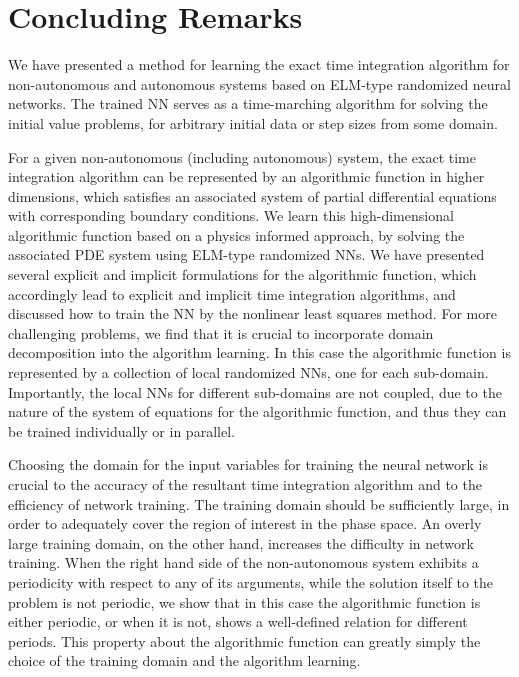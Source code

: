 \section{Concluding Remarks}
\label{sec_summary}



We have presented a method for learning the exact time integration
algorithm for non-autonomous and autonomous systems  based on ELM-type randomized
neural networks.
The trained NN  serves as a time-marching algorithm for solving
the initial value problems, for arbitrary initial data or step sizes
from some domain. 


For a given non-autonomous (including autonomous) system,
the exact time integration algorithm can be represented
by an algorithmic function in higher dimensions,
which satisfies an associated system of
partial differential equations  with corresponding boundary conditions.
We learn this high-dimensional algorithmic function based on a physics informed approach,
by solving the associated PDE system using ELM-type randomized NNs.
We have presented several explicit and implicit formulations for
the algorithmic function, which accordingly lead to explicit and implicit
time integration algorithms, and discussed how to train the NN  by
the nonlinear least squares method.
For more challenging problems,  we find that it is
crucial to incorporate 
domain decomposition into the algorithm learning. 
In this case the algorithmic function is represented by a collection
of local randomized NNs, one for each sub-domain.
Importantly, the local NNs  for different sub-domains
are not coupled, due to the nature of the system of equations
for the algorithmic function, and thus they can be trained individually or in parallel.

Choosing the domain for the input variables  for
training the neural network is crucial to the accuracy of
the resultant time integration algorithm and to the efficiency of
network training. The training domain should be sufficiently large,
in order to adequately cover the region of interest in the
phase space. An overly large training domain,
on the other hand, increases the difficulty in network training.
%
When the right hand side of the non-autonomous system exhibits a periodicity
with respect to any of its arguments, while the solution itself to
the problem is not periodic, we show that in this case the algorithmic function
is either periodic, or when it is not, shows a well-defined relation
for different periods.
This property about the algorithmic function
can greatly simply the choice of the training domain and
the algorithm learning.

